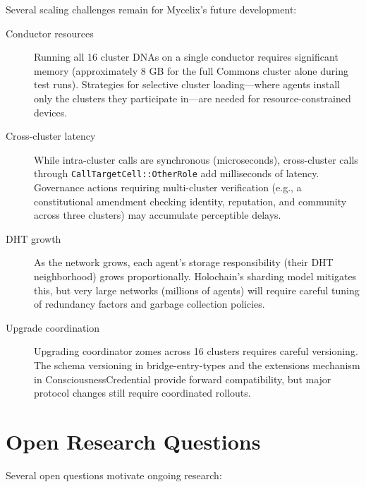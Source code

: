 \documentclass[12pt]{book}
\begin{document}
Several scaling challenges remain for Mycelix's future development:

\begin{description}
  \item[Conductor resources] Running all 16 cluster DNAs on a single conductor
    requires significant memory (approximately 8 GB for the full Commons
    cluster alone during test runs). Strategies for selective cluster loading---where
    agents install only the clusters they participate in---are needed for
    resource-constrained devices.
  \item[Cross-cluster latency] While intra-cluster calls are synchronous
    (microseconds), cross-cluster calls through \texttt{CallTargetCell::OtherRole}
    add milliseconds of latency. Governance actions requiring multi-cluster
    verification (e.g., a constitutional amendment checking identity, reputation,
    and community across three clusters) may accumulate perceptible delays.
  \item[DHT growth] As the network grows, each agent's storage responsibility
    (their DHT neighborhood) grows proportionally. Holochain's sharding model
    mitigates this, but very large networks (millions of agents) will require
    careful tuning of redundancy factors and garbage collection policies.
  \item[Upgrade coordination] Upgrading coordinator zomes across 16 clusters
    requires careful versioning. The schema versioning in bridge-entry-types
    and the extensions mechanism in ConsciousnessCredential provide forward
    compatibility, but major protocol changes still require coordinated rollouts.
\end{description}

\section{Open Research Questions}

Several open questions motivate ongoing research:
\end{document}
